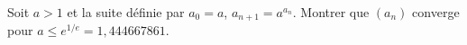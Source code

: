 Soit $a > 1$ et la suite définie par $a_0 = a$, $a_{n+1} = a^{a_n}$. Montrer que $(a_n)$ converge pour $a \leq e^{1/e} = 1{,}444667861$.
